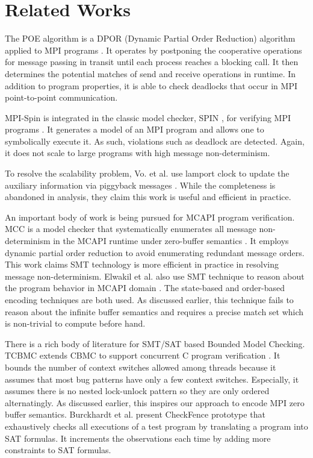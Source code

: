 \section{Related Works}
The POE algorithm is a DPOR (Dynamic Partial Order Reduction) algorithm \cite{DBLP:conf/popl/FlanaganG05} applied to MPI programs \cite{DBLP:conf/ppopp/VakkalankaSGK08}. It operates by postponing the cooperative operations for message passing in transit until each process reaches a blocking call. It then determines the potential matches of send and receive operations in runtime. In addition to program properties, it is able to check deadlocks that occur in MPI point-to-point communication.

MPI-Spin is integrated in the classic model checker, SPIN \cite{DBLP:journals/tse/Holzmann97}, for verifying MPI programs \cite{DBLP:conf/vmcai/Siegel07}. It generates a model of an MPI program and allows one to symbolically execute it. As such, violations such as deadlock are detected. Again, it does not scale to large programs with high message non-determinism.

To resolve the scalability problem, Vo. et al. use lamport clock to update the auxiliary information via piggyback messages \cite{DBLP:conf/sc/VoAGSSB10, DBLP:conf/IEEEpact/VoGKSSB11}. While the completeness is abandoned in analysis, they claim this work is useful and efficient in practice. 

An important body of work is being pursued for MCAPI program verification. MCC is a model checker that systematically enumerates all message non-determinism in the MCAPI runtime under zero-buffer semantics \cite{DBLP:conf/fmcad/SharmaGMH09}. It employs dynamic partial order reduction to avoid enumerating redundant message orders. This work claims SMT technology is more efficient in practice in resolving message non-determinism. Elwakil et al. also use SMT technique to reason about the program behavior in MCAPI domain \cite{DBLP:conf/issta/ElwakilY10}. The state-based and order-based encoding techniques are both used. As discussed earlier, this technique fails to reason about the infinite buffer semantics and requires a precise match set which is non-trivial to compute before hand.

There is a rich body of literature for SMT/SAT based Bounded Model Checking. 
TCBMC extends CBMC \cite{DBLP:conf/tacas/ClarkeKL04} to support concurrent C program verification \cite{DBLP:conf/cav/RabinovitzG05}. It bounds the number of context switches allowed among threads because it assumes that most bug patterns have only a few context switches. Especially, it assumes there is no nested lock-unlock pattern so they are only ordered alternatingly. As discussed earlier, this inspires our approach to encode MPI zero buffer semantics.
Burckhardt et al. present CheckFence prototype \cite{DBLP:conf/pldi/BurckhardtAM07} that exhaustively checks all executions of a test program by translating a program into SAT formulas. It increments the observations each time by adding more constraints to SAT formulas. 
